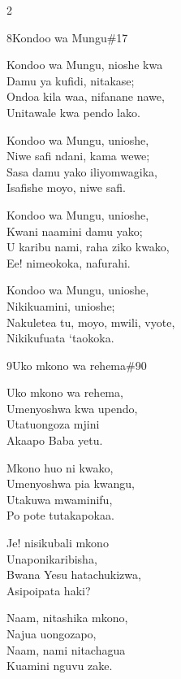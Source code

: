\begin{multicols}{2}
\begin{hymn}{8}{Kondoo wa Mungu}{\#17}
\begin{stanza}
Kondoo wa Mungu, nioshe kwa\\
Damu ya kufidi, nitakase;\\
Ondoa kila waa, nifanane nawe,\\
Unitawale kwa pendo lako.
\end{stanza}
\begin{stanza}
Kondoo wa Mungu, unioshe,\\
Niwe safi ndani, kama wewe;\\
Sasa damu yako iliyomwagika,\\
Isafishe moyo, niwe safi.
\end{stanza}
\begin{stanza}
Kondoo wa Mungu, unioshe,\\
Kwani naamini damu yako;\\
U karibu nami, raha ziko kwako,\\
Ee! nimeokoka, nafurahi.
\end{stanza}
\begin{stanza}
Kondoo wa Mungu, unioshe,\\
Nikikuamini, unioshe;\\
Nakuletea tu, moyo, mwili, vyote,\\
Nikikufuata `taokoka.
\end{stanza}
\end{hymn}

\begin{hymn}{9}{Uko mkono wa rehema}{\#90}
\begin{stanza}
Uko mkono wa rehema,\\
Umenyoshwa kwa upendo,\\
Utatuongoza mjini\\
Akaapo Baba yetu.
\end{stanza}
\begin{chorus}
Mkono huo ni kwako,\\
Umenyoshwa pia kwangu,\\
Utakuwa mwaminifu,\\
Po pote tutakapokaa.
\end{chorus}
\begin{stanza}
Je! nisikubali mkono\\
Unaponikaribisha,\\
Bwana Yesu hatachukizwa,\\
Asipoipata haki?
\end{stanza}
\begin{stanza}
Naam, nitashika mkono,\\
Najua uongozapo,\\
Naam, nami nitachagua\\
Kuamini nguvu zake.
\end{stanza}
\end{hymn}


\end{multicols}
